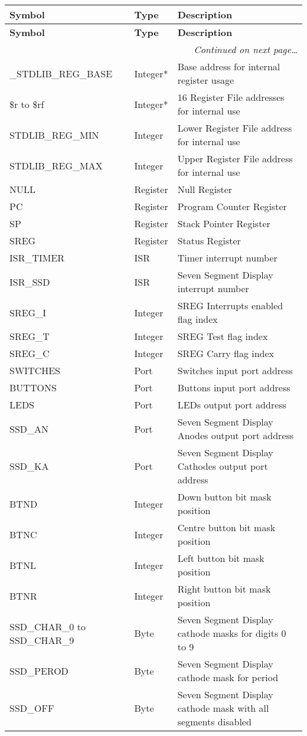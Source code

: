 \documentclass[12pt,twoside]{report}
\begin{document}
{\scriptsize
\begin{longtable}{ | l | l | l | }
  \hline
  \textbf{Symbol} & \textbf{Type} & \textbf{Description} \\
  \hline
\endfirsthead
  \hline
  \textbf{Symbol} & \textbf{Type} & \textbf{Description} \\
  \hline

\endhead
  \hline
  \multicolumn{3}{r}{\emph{Continued on next page\ldots}}
\endfoot

\endlastfoot
 \hline
 \_STDLIB\_USER\_ENTRY\_POINT & Label* & User code entry point \\
 \_STDLIB\_REG\_BASE & Integer* & Base address for internal register usage \\
 \$r to \$rf & Integer* & 16 Register File addresses for internal use \\
 STDLIB\_REG\_MIN & Integer & Lower Register File address for internal use \\
 STDLIB\_REG\_MAX & Integer & Upper Register File address for internal use \\
 NULL & Register & Null Register \\
 PC & Register & Program Counter Register \\
 SP & Register & Stack Pointer Register \\
 SREG & Register & Status Register \\
 ISR\_TIMER & ISR & Timer interrupt number \\
 ISR\_SSD & ISR & Seven Segment Display interrupt number \\
 SREG\_I & Integer & SREG Interrupts enabled flag index \\
 SREG\_T & Integer & SREG Test flag index \\
 SREG\_C & Integer & SREG Carry flag index \\
 SWITCHES & Port & Switches input port address \\
 BUTTONS & Port & Buttons input port address \\
 LEDS & Port & LEDs output port address \\
 SSD\_AN & Port & Seven Segment Display Anodes output port address \\
 SSD\_KA & Port & Seven Segment Display Cathodes output port address \\
 BTND & Integer & Down button bit mask position \\
 BTNC & Integer & Centre button bit mask position \\
 BTNL & Integer & Left button bit mask position \\
 BTNR & Integer & Right button bit mask position \\
 SSD\_CHAR\_0 to SSD\_CHAR\_9 & Byte & Seven Segment Display cathode masks for digits 0 to 9 \\
 SSD\_PEROD & Byte & Seven Segment Display cathode mask for period \\
 SSD\_OFF & Byte & Seven Segment Display cathode mask with all segments disabled \\
 \hline
\end{longtable}}
\end{document}
